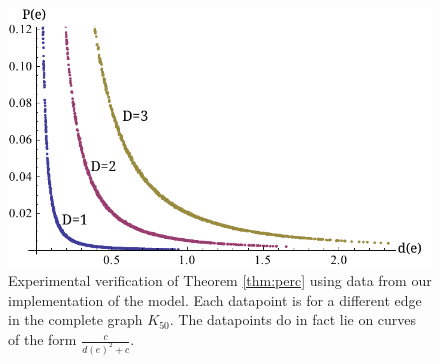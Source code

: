 \documentclass[a4paper,10pt]{article}
\begin{document}
\begin{figure}
 \centering
 \includegraphics{images/edge_existence2.pdf}
 \caption{Experimental verification of Theorem \ref{thm:perc} using data from our implementation of the model. Each datapoint is for a different edge in the complete graph $K_{50}$. The datapoints do in fact lie on curves of the form $\frac{c}{d(e)^2 + c}$.}
\end{figure}
\end{document}
